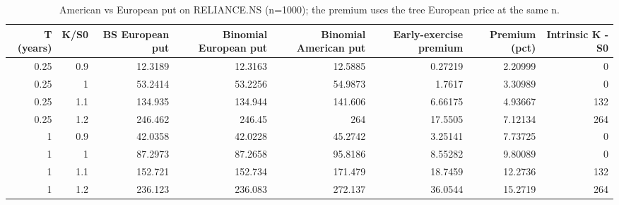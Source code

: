 \begin{table}
\centering
\small
\caption{American vs European put on RELIANCE.NS (n=1000); the premium uses the tree European price at the same n.}
\label{tab:e11_american}
\begin{adjustbox}{max width=\textwidth}
\begin{tabular}{rrrrrrrr}
\toprule
T (years) & K/S0 & BS European put & Binomial European put & Binomial American put & Early-exercise premium & Premium (pct) & Intrinsic K - S0 \\
\midrule
0.25 & 0.9 & 12.3189 & 12.3163 & 12.5885 & 0.27219 & 2.20999 & 0 \\
0.25 & 1 & 53.2414 & 53.2256 & 54.9873 & 1.7617 & 3.30989 & 0 \\
0.25 & 1.1 & 134.935 & 134.944 & 141.606 & 6.66175 & 4.93667 & 132 \\
0.25 & 1.2 & 246.462 & 246.45 & 264 & 17.5505 & 7.12134 & 264 \\
1 & 0.9 & 42.0358 & 42.0228 & 45.2742 & 3.25141 & 7.73725 & 0 \\
1 & 1 & 87.2973 & 87.2658 & 95.8186 & 8.55282 & 9.80089 & 0 \\
1 & 1.1 & 152.721 & 152.734 & 171.479 & 18.7459 & 12.2736 & 132 \\
1 & 1.2 & 236.123 & 236.083 & 272.137 & 36.0544 & 15.2719 & 264 \\
\bottomrule
\end{tabular}
\end{adjustbox}
\end{table}
